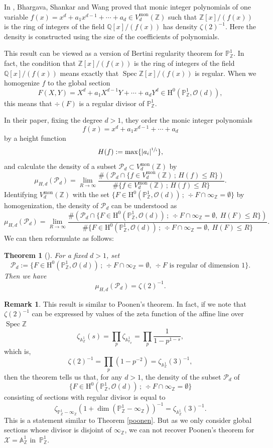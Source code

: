 \documentclass[11pt]{article}
\numberwithin{equation}{section}
\newcommand{\sep}{\,;\,}
\theoremstyle{plain}
\newtheorem{thm}{Theorem}[section]
\theoremstyle{definition}
\newtheorem*{rmq}{Remark}
\newcommand{\ho}{\mathrm{H}}
\newcommand{\X}{\mathcal{X}}
\newcommand{\A}{\mathbb{A}}
\newcommand{\Q}{\mathbb{Q}}
\newcommand{\Z}{\mathbb{Z}}
\newcommand{\pr}{\mathbb{P}}
\newcommand{\F}{\mathbb{F}}
\DeclareMathOperator{\Spec}{Spec}
\begin{document}
In \cite{BSW16}, Bhargava, Shankar and Wang proved that monic integer polynomials of one variable $f(x)=x^d+a_1x^{d-1}+\cdots+a_d\in V^{\mathrm{mon}}_d(\Z)$ such that $\Z[x]/(f(x))$ is the ring of integers of the field $\Q[x]/(f(x))$ has density $\zeta(2)^{-1}$. Here the density is constructed using the size of the coefficients of polynomials.

This result can be viewed as a version of Bertini regularity theorem for $\pr^1_{\Z}$. In fact, the condition that $\Z[x]/(f(x))$ is the ring of integers of the field $\Q[x]/(f(x))$ means exactly that
$\Spec \Z[x]/(f(x))$ is regular. When we homogenize $f$ to the global section
\[
F(X,Y)=X^d+a_1X^{d-1}Y+\cdots+ a_dY^d\in \ho^0(\pr^1_{\Z}, \mathcal{O}(d)),
\]
this means that $\div (F)$ is a regular divisor of $\pr^1_{\Z}$.

In their paper, fixing the degree $d>1$, they order the monic integer polynomials
\[
f(x)=x^d+a_1x^{d-1}+\cdots+a_d
\]
by a height function
\[
H(f):=\max\{ |a_i|^{\sfrac{1}{i}} \},
\]
and calculate the density of a subset $\mathcal{P}_d\subset V^{\mathrm{mon}}_d(\Z)$ by
\[
\mu_{H,d}(\mathcal{P}_d)=\lim_{R\to \infty} \frac{ \#\left(\mathcal{P}_d\cap \{ f\in V^{\mathrm{mon}}_d(\Z)\sep H(f)\leq R \} \right)}{\#\{ f\in V^{\mathrm{mon}}_d(\Z)\sep H(f)\leq R \}}.
\]
Identifying $V^{\mathrm{mon}}_d(\Z)$ with the set $\{ F\in \ho^0(\pr^1_{\Z}, \mathcal{O}(d))\sep \div F\cap \infty_{\Z}=\emptyset \}$ by homogenization, the density of
$\mathcal{P}_d$ can be understood as
\[
\mu_{H,d}(\mathcal{P}_d)=\lim_{R\to \infty} \frac{ \#\left(\mathcal{P}_d\cap \{ F\in \ho^0(\pr^1_{\Z}, \mathcal{O}(d))\sep \div F\cap \infty_{\Z}=\emptyset,\ H(F)\leq R \} \right)}{\#\{ F\in \ho^0(\pr^1_{\Z}, \mathcal{O}(d))\sep \div F\cap \infty_{\Z}=\emptyset,\ H(F)\leq R \}}.
\]
We can then reformulate \cite[Th.\,1.2]{BSW16} as follows:
\begin{thm}[{\cite[Th.\,1.2]{BSW16}}]
For a fixed $d>1$, set
\[
\mathcal{P}_d:=\{ F\in \ho^0(\pr^1_{\Z}, \mathcal{O}(d))\sep \div F\cap \infty_{\Z}=\emptyset,\ \div F \text{ is regular of dimension }1 \}.
\]
Then we have
\[
\mu_{H,d}(\mathcal{P}_d)=\zeta(2)^{-1}.
\]
\end{thm}
\begin{rmq}
This result is similar to Poonen's theorem. In fact, if we note that $\zeta(2)^{-1}$ can be expressed by values of the zeta function of the affine line over $\Spec \Z$
\[
\zeta_{\A^1_{\Z}}(s)=\prod_{p}\zeta_{\A^1_{\F_p}}=\prod_{p}\frac{1}{1-p^{1-s}},
\]
which is,
\[
\zeta(2)^{-1}=\prod_p (1-p^{-2})=\zeta_{\A^1_{\Z}}(3)^{-1},
\]
then the theorem tells us that, for any $d>1$, the density of the subset $\mathcal{P}_d$ of
\[
\{ F\in \ho^0(\pr^1_{\Z}, \mathcal{O}(d))\sep \div F\cap \infty_{\Z}=\emptyset \}
\]
consisting of sections with regular divisor is equal to
\[
\zeta_{\pr^1_{\Z}-\infty_{\Z}}\left(1+\dim(\pr^1_{\Z}-\infty_{\Z}) \right)^{-1}=\zeta_{\A^1_{\Z}}(3)^{-1}.
\]
This is a statement similar to Theorem \ref{poonen}. But as we only consider global sections whose divisor is disjoint of $\infty_{\Z}$, we can not recover Poonen's theorem for $\X=\A^1_{\Z}$ in~$\pr^1_{\Z}$.
\end{rmq}
\end{document}
